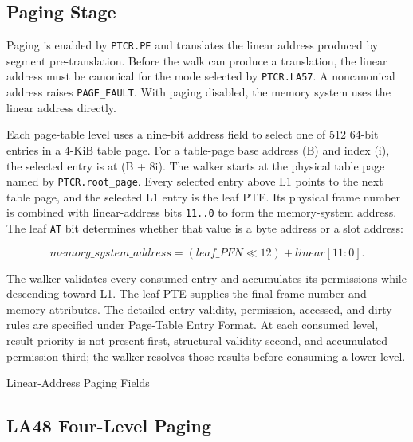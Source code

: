 \subsection{Paging Stage}

Paging is enabled by \texttt{PTCR.PE} and translates the linear address produced by segment pre-translation. Before
the walk can produce a translation, the linear address must be canonical for the mode selected by
\texttt{PTCR.LA57}. A noncanonical address raises \texttt{PAGE\_FAULT}. With paging disabled, the memory system uses
the linear address directly.

Each page-table level uses a nine-bit address field to select one of 512 64-bit entries in a 4-KiB table page. For a
table-page base address (B) and index (i), the selected entry is at (B + 8i). The walker starts at the physical
table page named by \texttt{PTCR.root\_page}. Every selected entry above L1 points to the next table page, and the
selected L1 entry is the leaf PTE. Its physical frame number is combined
with linear-address bits \texttt{11..0} to form the memory-system address. The leaf \texttt{AT} bit determines
whether that value is a byte address or a slot address:

\[
  \mathit{memory\_system\_address} = (\mathit{leaf\_PFN} \ll 12) + \mathit{linear}[11:0].
\]

The walker validates every consumed entry and accumulates its permissions while descending toward L1. The leaf PTE
supplies the final frame number and memory attributes. The detailed entry-validity, permission, accessed, and dirty
rules are specified under Page-Table Entry Format. At each consumed level, result priority is not-present first,
structural validity second, and accumulated permission third; the walker resolves those results before consuming a
lower level.

\begin{manuallistedformatdiagram}{Linear-Address Paging Fields}
\end{manuallistedformatdiagram}

\clearpage
\subsection{LA48 Four-Level Paging}

